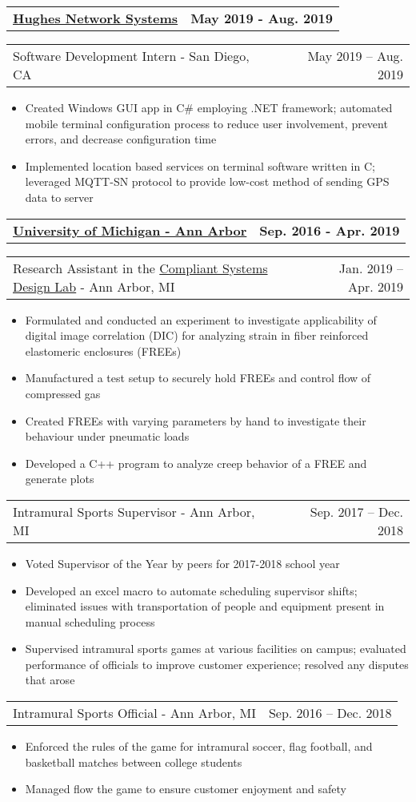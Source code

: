 \documentclass[letterpaper,11pt]{article}
\makeatletter
\newcommand{\resumeItem}[1]{
	\item\small{
		#1
	}
}
\newcommand{\resumeCompanyHeading}[2]{
  \vspace{-1pt}\item
    \begin{tabular*}{0.97\textwidth}[t]{l@{\extracolsep{\fill}}r}
      \textbf{#1} & \textbf{#2} \\
    \end{tabular*}\vspace{-0pt}
}
\newcommand{\resumeJobHeading}[3]{
	\vspace{-1pt}
	\begin{tabular*}{0.97\textwidth}[t]{l@{\extracolsep{\fill}}r}
		{\small#1} - {\small #2} & {\small #3} \\
	\end{tabular*}\vspace{-4pt}
}
\newcommand{\resumeItemListStart}{\begin{itemize}}
\newcommand{\resumeItemListEnd}{\end{itemize}\vspace{-4pt}}
\makeatother
\begin{document}
  \resumeCompanyHeading{\href{https://www.hughes.com/}{Hughes Network Systems}}{May 2019 - Aug. 2019}
    \resumeJobHeading{Software Development Intern}{San Diego, CA}{May 2019 -- Aug. 2019}
    \resumeItemListStart
      \resumeItem{Created Windows GUI app in C\# employing .NET framework; automated mobile terminal configuration process to reduce user involvement, prevent errors, and decrease configuration time}
      \resumeItem{Implemented location based services on terminal software written in C; leveraged MQTT-SN protocol to provide low-cost method of sending GPS data to server}
    \resumeItemListEnd

  \resumeCompanyHeading{\href{https://umich.edu/}{University of Michigan - Ann Arbor}}{Sep. 2016 - Apr. 2019}
    \resumeJobHeading{Research Assistant in the \href{http://csdl.engin.umich.edu/}{Compliant Systems Design Lab}}{Ann Arbor, MI}{Jan. 2019 -- Apr. 2019}
    \resumeItemListStart
      \resumeItem{Formulated and conducted an experiment to investigate applicability of digital image correlation (DIC) for analyzing strain in fiber reinforced elastomeric enclosures (FREEs)}
      \resumeItem{Manufactured a test setup to securely hold FREEs and control flow of compressed gas}
      \resumeItem{Created FREEs with varying parameters by hand to investigate their behaviour under pneumatic loads}
      \resumeItem{Developed a C++ program to analyze creep behavior of a FREE and generate plots}
    \resumeItemListEnd

    \resumeJobHeading{Intramural Sports Supervisor}{Ann Arbor, MI}{Sep. 2017 -- Dec. 2018}
    \resumeItemListStart
      \resumeItem{Voted Supervisor of the Year by peers for 2017-2018 school year}
      \resumeItem{Developed an excel macro to automate scheduling supervisor shifts; eliminated issues with transportation of people and equipment present in manual scheduling process}
      \resumeItem{Supervised intramural sports games at various facilities on campus; evaluated performance of officials to improve customer experience; resolved any disputes that arose}
    \resumeItemListEnd

    \resumeJobHeading{Intramural Sports Official}{Ann Arbor, MI}{Sep. 2016 -- Dec. 2018}
    \resumeItemListStart
      \resumeItem{Enforced the rules of the game for intramural soccer, flag football, and basketball matches between college students}
      \resumeItem{Managed flow the game to ensure customer enjoyment and safety}
    \resumeItemListEnd
\end{document}

